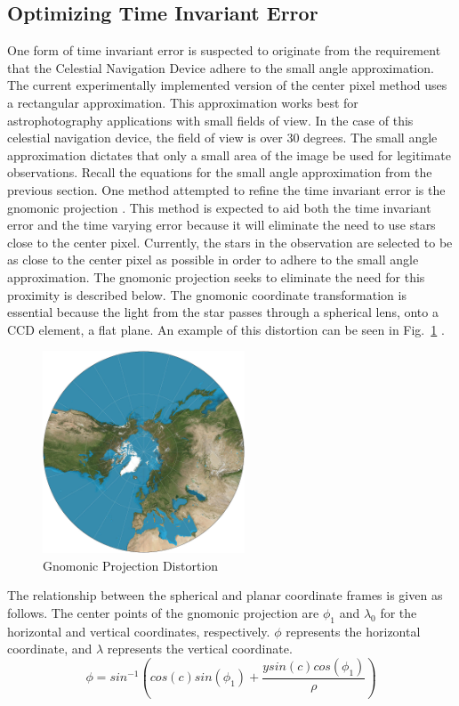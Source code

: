 \documentclass[12pt,a4paper]{book}
\begin{document}
\subsection{Optimizing Time Invariant Error}
One form of time invariant error is suspected to originate from the requirement that the Celestial Navigation Device adhere to the small angle approximation.  The current experimentally implemented version of the center pixel method uses a rectangular approximation.  This approximation works best for astrophotography applications with small fields of view.  In the case of this celestial navigation device, the field of view is over 30 degrees.  The small angle approximation dictates that only a small area of the image be used for legitimate observations.  Recall the equations for the small angle approximation from the previous section.  
One method attempted to refine the time invariant error is the gnomonic projection \cite{b:gnomonic}.  This method is expected to aid both the time invariant error and the time varying error because it will eliminate the need to use stars close to the center pixel.  Currently, the stars in the observation are selected to be as close to the center pixel as possible in order to adhere to the small angle approximation.  The gnomonic projection seeks to eliminate the need for this proximity is described below.  The gnomonic coordinate transformation is essential because the light from the star passes through a spherical lens, onto a CCD element, a flat plane.  An example of this distortion can be seen in Fig.~\ref{f:gp} \cite{b:gnomonic}.
\begin{figure}[!ht]
\centering
\includegraphics[height=6cm]{GP.jpg}
\caption{Gnomonic Projection Distortion \cite{b:gnomphoto}}\label{f:gp}
\end{figure}
The relationship between the spherical and planar coordinate frames is given as follows. The center points of the gnomonic projection are $\phi_{1}$ and $\lambda_{0}$ for the horizontal and vertical coordinates, respectively.  $\phi$ represents the horizontal coordinate, and $\lambda$ represents the vertical coordinate.  
\begin{equation}
\phi = sin^{-1} \left ( cos(c)sin(\phi_{1}) + \frac{ysin(c)cos(\phi_{1})}{\rho}\right)
\end{equation}
\end{document}
